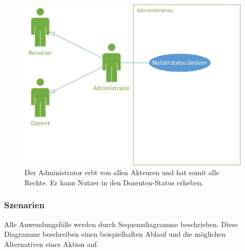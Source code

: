\documentclass[12pt,a4paper]{article}
\begin{document}
\begin{figure}[H]
	\centering
	\includegraphics[width=\textwidth]{Bilder/Anwendungsfalldiagramme/Admin.jpg}
	\caption{Der Administrator erbt von allen Akteuren und hat somit alle Rechte. Er kann Nutzer in den Dozenten-Status erheben.}
	\label{AwfAdmin}
\end{figure}

\newpage

\subsubsection{Szenarien}
Alle Anwendungsfälle werden durch Sequenzdiagramme beschrieben. Diese Diagramme beschreiben einen beispielhaften Ablauf und die möglichen Alternativen einer Aktion auf.
\end{document}
